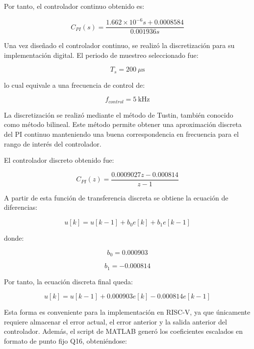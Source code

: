\documentclass[conference]{IEEEtran}
\begin{document}
Por tanto, el controlador continuo obtenido es:

\begin{equation}
    C_{PI}(s)=
    \frac{1.662\times10^{-6}s+0.0008584}{0.001936s}
\end{equation}

Una vez diseñado el controlador continuo, se realizó la discretización para su implementación digital. El periodo de muestreo seleccionado fue:

\begin{equation}
    T_s=200~\mu\mathrm{s}
\end{equation}

lo cual equivale a una frecuencia de control de:

\begin{equation}
    f_{control}=5~\mathrm{kHz}
\end{equation}

La discretización se realizó mediante el método de Tustin, también conocido como método bilineal. Este método permite obtener una aproximación discreta del PI continuo manteniendo una buena correspondencia en frecuencia para el rango de interés del controlador.

El controlador discreto obtenido fue:

\begin{equation}
    C_{PI}(z)=
    \frac{0.0009027z-0.000814}{z-1}
\end{equation}

A partir de esta función de transferencia discreta se obtiene la ecuación de
diferencias:

\begin{equation}
    u[k]=u[k-1]+b_0e[k]+b_1e[k-1]
\end{equation}

donde:

\begin{equation}
    b_0=0.000903
\end{equation}

\begin{equation}
    b_1=-0.000814
\end{equation}

Por tanto, la ecuación discreta final queda:

\begin{equation}
    u[k]=u[k-1]+0.000903e[k]-0.000814e[k-1]
\end{equation}

Esta forma es conveniente para la implementación en RISC-V, ya que únicamente requiere almacenar el error actual, el error anterior y la salida anterior del controlador. Además, el script de MATLAB generó los coeficientes escalados en formato de punto fijo Q16, obteniéndose:
\end{document}

